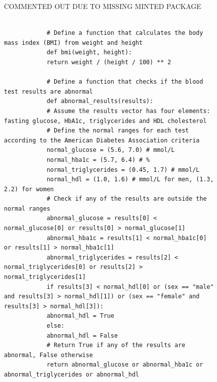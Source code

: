 \begin{figure}
	COMMENTED OUT DUE TO MISSING MINTED PACKAGE
	\iffalse
	\begin{tcolorbox}[raster multicolumn=1, enhanced, attach boxed title to top center={yshift=-3mm}, title=text-alpha-002-latest]
		\begin{verbatim}
			
			# Define a function that calculates the body mass index (BMI) from weight and height
			def bmi(weight, height):
			return weight / (height / 100) ** 2
			
			# Define a function that checks if the blood test results are abnormal
			def abnormal_results(results):
			# Assume the results vector has four elements: fasting glucose, HbA1c, triglycerides and HDL cholesterol
			# Define the normal ranges for each test according to the American Diabetes Association criteria
			normal_glucose = (5.6, 7.0) # mmol/L
			normal_hba1c = (5.7, 6.4) # %
			normal_triglycerides = (0.45, 1.7) # mmol/L
			normal_hdl = (1.0, 1.6) # mmol/L for men, (1.3, 2.2) for women
			# Check if any of the results are outside the normal ranges
			abnormal_glucose = results[0] < normal_glucose[0] or results[0] > normal_glucose[1]
			abnormal_hba1c = results[1] < normal_hba1c[0] or results[1] > normal_hba1c[1]
			abnormal_triglycerides = results[2] < normal_triglycerides[0] or results[2] > normal_triglycerides[1]
			if results[3] < normal_hdl[0] or (sex == "male" and results[3] > normal_hdl[1]) or (sex == "female" and results[3] > normal_hdl[3]):
			abnormal_hdl = True
			else:
			abnormal_hdl = False
			# Return True if any of the results are abnormal, False otherwise
			return abnormal_glucose or abnormal_hba1c or abnormal_triglycerides or abnormal_hdl
			

\end{verbatim}
\end{tcolorbox}
\end{figure}
